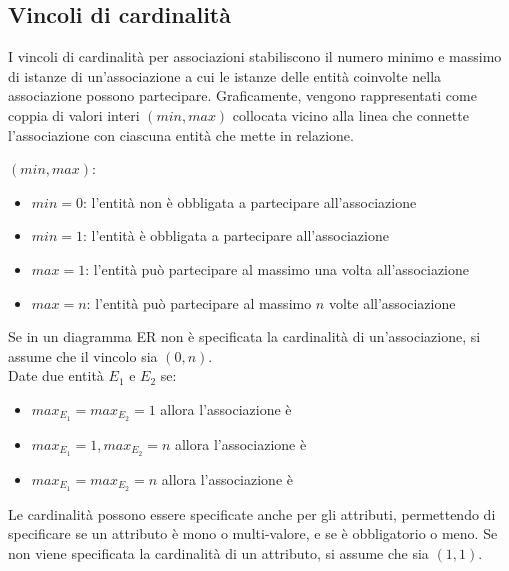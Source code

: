 \documentclass[12pt, a4paper]{report}
\begin{document}
    \subsection{Vincoli di cardinalità}
    I vincoli di cardinalità per associazioni stabiliscono il numero minimo e massimo di istanze di un'associazione a cui le istanze delle entità coinvolte nella associazione possono partecipare. Graficamente, vengono rappresentati come coppia di valori interi $(min,max)$ collocata vicino alla linea che connette l'associazione con ciascuna entità che mette in relazione.
    \begin{center}
    \end{center}
    $(min,max)$:
    \begin{itemize}
        \item $min=0$: l'entità non è obbligata a partecipare all'associazione
        \item $min=1$: l'entità è obbligata a partecipare all'associazione
        \item $max=1$: l'entità può partecipare al massimo una volta all'associazione
        \item $max=n$: l'entità può partecipare al massimo $n$ volte all'associazione
    \end{itemize}
    Se in un diagramma ER non è specificata la cardinalità di un'associazione, si assume che il vincolo sia $(0,n)$.\\
    Date due entità $E_{1}$ e $E_{2}$ se:
    \begin{itemize}
        \item $max_{E_{1}}=max_{E_{2}}=1$ allora l'associazione è 
        \item $max_{E_{1}}=1,max_{E_{2}}=n$ allora l'associazione è 
        \item $max_{E_{1}}=max_{E_{2}}=n$ allora l'associazione è 
    \end{itemize}
    Le cardinalità possono essere specificate anche per gli attributi, permettendo di specificare se un attributo è mono o multi-valore, e se è obbligatorio o meno. Se non viene specificata la cardinalità di un attributo, si assume che sia $(1,1)$.
\end{document}
